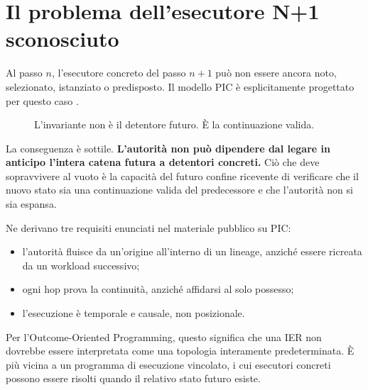 \documentclass[10pt,oneside,openany]{book}
\begin{document}
\chapter{Il problema dell'esecutore N+1 sconosciuto}

Al passo $n$, l'esecutore concreto del passo $n+1$ può non essere ancora noto, selezionato, istanziato o predisposto. Il modello PIC è esplicitamente progettato per questo caso \cite{gallo2026pic,picwhy}.

\begin{figure}[ht]
\centering
{}
\caption{L'invariante non è il detentore futuro. È la continuazione valida.}
\end{figure}

La conseguenza è sottile. \textbf{L'autorità non può dipendere dal legare in anticipo l'intera catena futura a detentori concreti.} Ciò che deve sopravvivere al vuoto è la capacità del futuro confine ricevente di verificare che il nuovo stato sia una continuazione valida del predecessore e che l'autorità non si sia espansa.

Ne derivano tre requisiti enunciati nel materiale pubblico su PIC:

\begin{itemize}
\item l'autorità fluisce da un'origine all'interno di un lineage, anziché essere ricreata da un workload successivo;
\item ogni hop prova la continuità, anziché affidarsi al solo possesso;
\item l'esecuzione è temporale e causale, non posizionale.
\end{itemize}

Per l'Outcome-Oriented Programming, questo significa che una IER non dovrebbe essere interpretata come una topologia interamente predeterminata. È più vicina a un programma di esecuzione vincolato, i cui esecutori concreti possono essere risolti quando il relativo stato futuro esiste.
\end{document}
